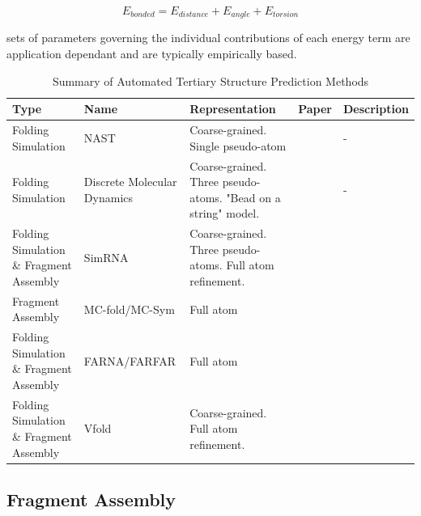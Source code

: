 \documentclass[journal]{IEEEtran}
\begin{document}
\begin{equation}
\label{eq:bonded-interactions}
	E_{bonded} = E_{distance} + E_{angle} + E_{torsion}
\end{equation}

sets of parameters governing the individual contributions of each energy term are application dependant and are typically empirically based. 

\begin{table}[t]
\centering
\caption{Summary of Automated Tertiary Structure Prediction Methods}
\label{table:tertiary-prediction-papers}
\begin{tabular}{|p{3cm}|p{2cm}|p{5cm}|l|p{5cm}|}
\hline
\textbf{Type}                           & \textbf{Name}               & \textbf{Representation}                                       & \textbf{Paper} & \textbf{Description} \\ \hline
Folding Simulation                      & NAST                        & Coarse-grained. Single pseudo-atom                            &                & -                    \\ \hline
Folding Simulation                      & Discrete Molecular Dynamics & Coarse-grained. Three pseudo-atoms. "Bead on a string" model. &                & -                    \\ \hline
Folding Simulation \& Fragment Assembly & SimRNA                      & Coarse-grained. Three pseudo-atoms. Full atom refinement.     &                &                      \\ \hline
Fragment Assembly                       & MC-fold/MC-Sym              & Full atom                                                     &                &                      \\ \hline
Folding Simulation \& Fragment Assembly & FARNA/FARFAR                & Full atom                                                     &                &                      \\ \hline
Folding Simulation \& Fragment Assembly & Vfold                       & Coarse-grained. Full atom refinement.                         &                &                      \\ \hline
\end{tabular}
\end{table}

\subsection{Fragment Assembly}
\label{subsec:fragment-assembly}
\end{document}
